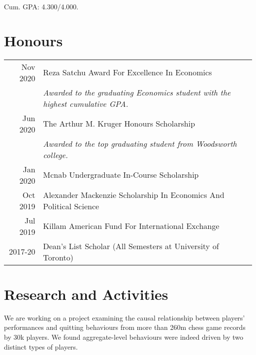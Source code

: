 \documentclass[letterpaper]{deedy-resume} %
\begin{document}
\begin{minipage}[t]{0.66\textwidth}
\begin{tightitemize}
\item Cum. GPA: 4.300/4.000.
\end{tightitemize}


\section{Honours} 

\begin{tabular}{rll}
Nov 2020	 & Reza Satchu Award For Excellence In Economics \\
			 & \emph{Awarded to the graduating Economics student with the highest cumulative GPA.} \\
Jun 2020	 & The Arthur M. Kruger Honours Scholarship \\
			 & \emph{Awarded to the top graduating student from Woodsworth college.}
\\
Jan 2020	 & Mcnab Undergraduate In-Course Scholarship \\
Oct 2019	 & Alexander Mackenzie Scholarship In Economics And Political Science\\
Jul 2019	 & Killam American Fund For International Exchange \\
2017-20		 & Dean's List Scholar (All Semesters at University of Toronto)
\end{tabular}

\sectionspace %




\section{Research and Activities}
\small{
}

\small{We are working on a project examining the causal relationship between players' performances and quitting behaviours from more than 260m chess game records by 30k players. We found aggregate-level behaviours were indeed driven by two distinct types of players.}


\end{minipage}
\end{document}
